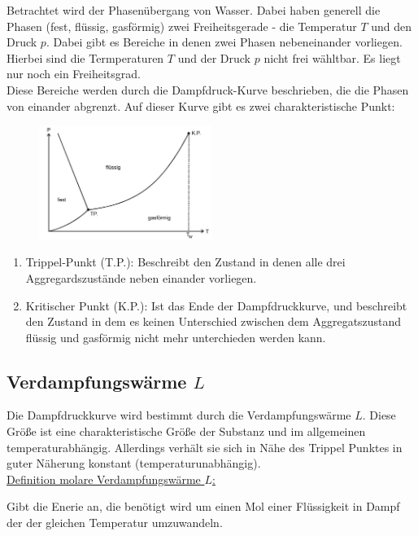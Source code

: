 Betrachtet wird der Phasenübergang von Wasser.
Dabei haben generell die Phasen (fest, flüssig, gasförmig) zwei Freiheitsgerade - die Temperatur $T$ und den Druck $p$.
Dabei gibt es Bereiche in denen zwei Phasen nebeneinander vorliegen. Hierbei sind die Termperaturen $T$ und der Druck $p$
nicht frei wähltbar. Es liegt nur noch ein Freiheitsgrad.\\
Diese Bereiche werden durch die Dampfdruck-Kurve beschrieben, die die Phasen von einander abgrenzt.
Auf dieser Kurve gibt es zwei charakteristische Punkt:
\begin{figure}
    \centering
    \includegraphics[width=0.5\textwidth]{bilder/zustandsdiagramm.jpg}
\end{figure}
\newpage
\begin{enumerate}
    \item Trippel-Punkt (T.P.): Beschreibt den Zustand in denen alle drei Aggregardszustände neben einander vorliegen.
    \item Kritischer Punkt (K.P.): Ist das Ende der Dampfdruckkurve, und beschreibt den Zustand in dem es keinen Unterschied
        zwischen dem Aggregatszustand flüssig und gasförmig nicht mehr unterchieden werden kann.
\end{enumerate}

\subsection{Verdampfungswärme $L$}
Die Dampfdruckkurve wird bestimmt durch die Verdampfungswärme $L$.
Diese Größe ist eine charakteristische Größe der Substanz und im allgemeinen temperaturabhängig.
Allerdings verhält sie sich in Nähe des Trippel Punktes in guter Näherung konstant (temperaturunabhängig).\\\newline
\uline{Definition molare Verdampfungswärme $L$:}
\begin{flushleft}
Gibt die Enerie an, die benötigt wird um einen Mol einer Flüssigkeit in Dampf der
der gleichen Temperatur umzuwandeln.
\end{flushleft}


